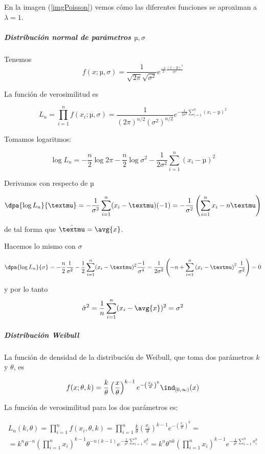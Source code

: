 \documentclass{apuntes}
\begin{document}
En la imagen (\ref{imgPoisson}) vemos cómo las diferentes funciones se aproximan a $\lambda = 1$.


\subparagraph{Distribución normal de parámetros $µ,\sigma$} Tenemos \[f(x;µ,\sigma) = \frac{1}{\sqrt{2\pi}\sqrt{\sigma^2}}e^{\frac{-1}{2}\frac{(x-µ)^2}{\sigma^2}} \]

La función de verosimilitud es

\[ L_n = \prod_{i=1}^n f(x_i;µ,\sigma) = \frac{1}{(2\pi)^{n/2} (\sigma^2)^{n/2}} e^{-\frac{1}{2\sigma^2}\sum_{i=1}^n(x_i-µ)^2} \]

Tomamos logaritmos:

\[ \log L_n = - \frac{n}{2}\log 2\pi - \frac{n}{2} \log \sigma^2 - \frac{1}{2\sigma^2} \sum_{i=1}^n(x_i-µ)^2 \]

Derivamos con respecto de $µ$

\[ \dpa{\log L_n}{µ} = - \frac{1}{\sigma^2} \sum_{i=1}^n(x_i-µ)(-1) = - \frac{1}{\sigma^2}\left( \sum_{i=1}^nx_i - nµ\right) \]

de tal forma que $\hat{µ} = \avg{x}$.

Hacemos lo mismo con $\sigma$

\[ \dpa{\log L_n}{\sigma} = - \frac{n}{2}\frac{1}{\sigma^2} - \frac{1}{2}\sum_{i=1}^n(x_i-µ)^2 \frac{-1}{\sigma^4} = \frac{1}{2\sigma^2}\left(-n + \sum_{i=1}^n\left(x_i-µ\right)^2\frac{1}{\sigma^2}\right) = 0 \]

y por lo tanto \[\hat{\sigma}^2 = \frac{1}{n}\sum_{i=1}^n(x_i-\avg{x})^2 = \sigma^2 \]

\subparagraph{Distribución Weibull} La función de densidad de la distribución de Weibull, que toma dos parámetros $k$ y $\theta$, es

\[ f(x; \theta, k) = \frac{k}{\theta}\left(\frac{x}{\theta}\right)^{k-1}e^{-\left(\frac{x_i}{\theta}\right)^k}\ind_{[0, \infty)}(x) \]

La función de verosimilitud para los dos parámetros es:

\begin{gather*}
 L_n(k,\theta) = \prod_{i=1}^n f(x_i, \theta, k) = \prod_{i=1}^n \frac{k}{\theta}\left(\frac{x_i}{\theta}\right)^{k-1}e^{-\left(\frac{x_i}{\theta}\right)^k} = \\
 = k^n \theta^{-n}\left(\prod_{i=1}^n x_i\right)^{k-1} \theta^{-n(k-1)} e^{-\frac{1}{\theta^2}\sum_{i=1}^nx_i^k} = k^n\theta^{nk} \left(\prod_{i=1}^n x_i\right)^{k-1} e^{-\frac{1}{\theta^k}\sum_{i=1}^nx_i^k}
 \end{gather*}
\end{document}
